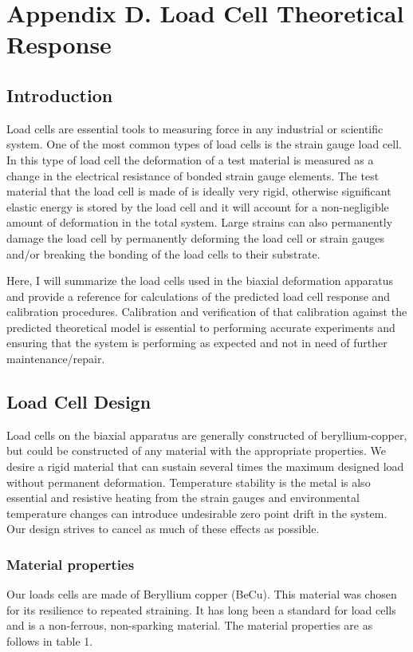 \chapter*{Appendix D. Load Cell Theoretical Response}

\section{Introduction}

Load cells are essential tools to measuring force in any industrial or
scientific system. One of the most common types of load cells is the strain
gauge load cell. In this type of load cell the deformation of a test material is
measured as a change in the electrical resistance of bonded strain gauge
elements. The test material that the load cell is made of is ideally very rigid,
otherwise significant elastic energy is stored by the load cell and it will
account for a non-negligible amount of deformation in the total system. Large
strains can also permanently damage the load cell by permanently deforming the
load cell or strain gauges and/or breaking the bonding of the load cells to
their substrate.

Here,  I will summarize the load cells used in the biaxial deformation apparatus
and provide a reference for calculations of the predicted load cell response and
calibration procedures. Calibration and verification of that calibration against
the predicted theoretical model is essential to performing accurate experiments
and ensuring that the system is performing as expected and not in need of
further maintenance/repair. 

\section{Load Cell Design}
Load cells on the biaxial apparatus are generally constructed of
beryllium-copper, but could be constructed of any material with the appropriate
properties. We desire a rigid material that can sustain several times the
maximum designed load without permanent deformation. Temperature stability is
the metal is also essential and resistive heating from the strain gauges and
environmental temperature changes can introduce undesirable zero point drift in
the system. Our design strives to cancel as much of these effects as possible.

\subsection{Material properties}
Our loads cells are made of Beryllium copper (BeCu). This material was chosen
for its resilience to repeated straining. It has long been a standard for
load cells and is a non-ferrous, non-sparking material. The material properties
are as follows in table 1.

